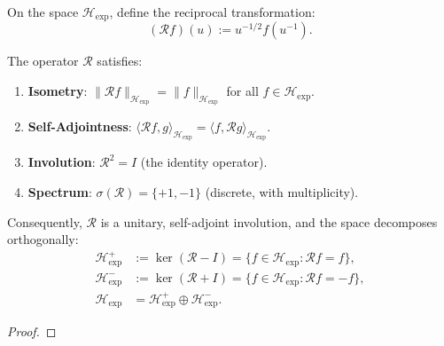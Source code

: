 \begin{definition}
\label{def:reciprocalTransformationOp}

On the space $\mathcal{H}_{\mathrm{exp}}$, define the reciprocal transformation:
\begin{equation}
(\mathcal{R}f)(u) := u^{-1/2} f(u^{-1}).
\end{equation}

\end{definition}

\begin{theorem}
\label{thm:reciprocalOperatorProperties}

The operator $\mathcal{R}$ satisfies:

\begin{enumerate}

\item[\textbf{(RO1)}] \textbf{Isometry}: $\|\mathcal{R}f\|_{\mathcal{H}_{\mathrm{exp}}} = \|f\|_{\mathcal{H}_{\mathrm{exp}}}$ for all $f \in \mathcal{H}_{\mathrm{exp}}$.

\item[\textbf{(RO2)}] \textbf{Self-Adjointness}: $\langle \mathcal{R}f, g \rangle_{\mathcal{H}_{\mathrm{exp}}} = \langle f, \mathcal{R}g \rangle_{\mathcal{H}_{\mathrm{exp}}}$.

\item[\textbf{(RO3)}] \textbf{Involution}: $\mathcal{R}^2 = I$ (the identity operator).

\item[\textbf{(RO4)}] \textbf{Spectrum}: $\sigma(\mathcal{R}) = \{+1, -1\}$ (discrete, with multiplicity).

\end{enumerate}

Consequently, $\mathcal{R}$ is a unitary, self-adjoint involution, and the space decomposes orthogonally:
\begin{align}
\mathcal{H}_{\mathrm{exp}}^+ &:= \ker(\mathcal{R} - I) = \{f \in \mathcal{H}_{\mathrm{exp}} : \mathcal{R}f = f\}, \\
\mathcal{H}_{\mathrm{exp}}^- &:= \ker(\mathcal{R} + I) = \{f \in \mathcal{H}_{\mathrm{exp}} : \mathcal{R}f = -f\}, \\
\mathcal{H}_{\mathrm{exp}} &= \mathcal{H}_{\mathrm{exp}}^+ \oplus \mathcal{H}_{\mathrm{exp}}^-.
\end{align}

\begin{proof}


\end{proof}
\end{theorem}
